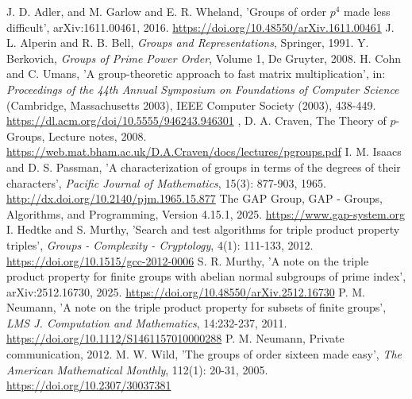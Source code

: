 \documentclass{amsart}
\theoremstyle{observation}
\theoremstyle{definition}
\theoremstyle{remark}
\numberwithin{equation}{section}
\begin{document}
\hypertarget{bib}{}
\begin{thebibliography}{}
J. D. Adler, and M. Garlow and E. R. Wheland, 'Groups of order $p^4$ made less difficult', arXiv:1611.00461, 2016. \url{https://doi.org/10.48550/arXiv.1611.00461}
J. L. Alperin and R. B. Bell, \emph{Groups and Representations}, Springer, 1991.
Y. Berkovich, \emph{Groups of Prime Power Order}, Volume 1, De Gruyter, 2008.
H. Cohn and C. Umans, 'A group-theoretic approach to fast matrix multiplication', in: \emph{Proceedings of the 44th Annual Symposium on Foundations of Computer Science} (Cambridge, Massachusetts 2003), IEEE Computer Society (2003), 438-449. \url{https://dl.acm.org/doi/10.5555/946243.946301}
, D. A. Craven, The Theory of $p$-Groups, Lecture notes, 2008. \url{https://web.mat.bham.ac.uk/D.A.Craven/docs/lectures/pgroups.pdf}
I. M. Isaacs and D. S. Passman, 'A characterization of groups in terms of the degrees of their characters', \emph{Pacific Journal of Mathematics}, 15(3): 877-903, 1965. \url{http://dx.doi.org/10.2140/pjm.1965.15.877}
The GAP Group, GAP - Groups, Algorithms, and Programming, Version 4.15.1, 2025. \url{https://www.gap-system.org}
I. Hedtke and S. Murthy, 'Search and test algorithms for triple product property triples', \emph{Groups - Complexity - Cryptology}, 4(1): 111-133, 2012. \url{https://doi.org/10.1515/gcc-2012-0006}
S. R. Murthy, 'A note on the triple product property for finite groups with abelian normal subgroups of prime index', arXiv:2512.16730, 2025. \url{https://doi.org/10.48550/arXiv.2512.16730}
P. M. Neumann, 'A note on the triple product property for subsets of finite groups', \emph{LMS J. Computation and Mathematics}, 14:232-237, 2011. \url{https://doi.org/10.1112/S1461157010000288}
P. M. Neumann, Private communication, 2012.
M. W. Wild, 'The groups of order sixteen made easy', \emph{The American Mathematical Monthly}, 112(1): 20-31, 2005. \url{https://doi.org/10.2307/30037381}
\end{thebibliography}
\end{document}

